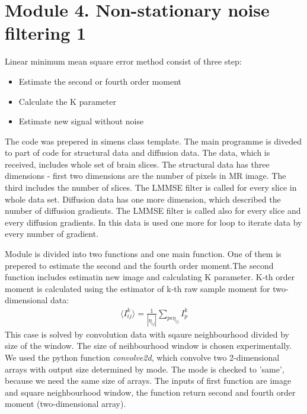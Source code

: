 \section{Module 4. Non-stationary noise filtering 1}

Linear minimum mean square error method consist of three step:

\begin{itemize}
\item Estimate the second or fourth order moment
\item Calculate the K parameter
\item Estimate new signal without noise
\end{itemize}

The code was prepered in simens class template. The main programme is diveded to part of code for structural data and diffusion data. The data, which is received, includes whole set of brain slices. The structural data has three dimensions - first two dimensions are the number of pixels in MR image. The third includes the number of slices. The LMMSE filter is called for every slice in whole data set. Diffusion data has one more dimension, which described the number of diffusion gradients. The LMMSE filter is called also for every slice and every diffusion gradients. In this data is used one more for loop to iterate data by every number of gradient.

Module is divided into two functions and one main function. One of them is prepered to estimate the second and the fourth order moment.The second function includes estimatin new image and calculating K parameter. K-th order moment is calculated using the estimator of k-th raw sample moment for two-dimensional data: 
\begin{equation}
\begin{aligned}\langle I_{ij}^k\rangle=\frac{1}{|\eta_{ij}|}\sum\limits_{p\epsilon\eta_{ij}} I_p^k \end{aligned}
\label{m4Im1}
\end{equation}
This case is solved by convolution data with sqaure neighbourhood divided by size of the window. The size of neihbourhood window is chosen experimentally. We used the python function \emph{convolve2d}, which convolve two 2-dimensional arrays with output size determined by mode. The mode is checked to 'same', because we need the same size of arrays. The inputs of first function are image and square neighbourhood window, the function return second and fourth order moment (two-dimensional array).

